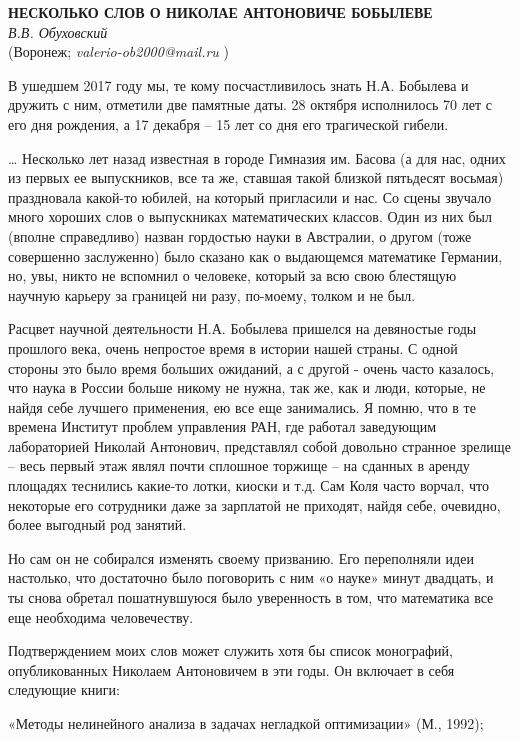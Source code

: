 \begin{center}{ \bf  НЕСКОЛЬКО СЛОВ О НИКОЛАЕ АНТОНОВИЧЕ БОБЫЛЕВЕ}\\
{\it В.В. Обуховский} \\
(Воронеж; {\it valerio-ob2000@mail.ru} )
\end{center}

В ушедшем 2017 году мы, те кому посчастливилось знать Н.А. Бобылева и дружить с ним, отметили две памятные даты. 28 октября исполнилось 70 лет с его дня рождения, а 17 декабря – 15 лет со дня его трагической гибели.

	… Несколько лет назад известная в городе Гимназия им. Басова (а для нас, одних из первых ее выпускников, все та же, ставшая такой близкой пятьдесят восьмая) праздновала какой-то юбилей, на который пригласили и нас. Со сцены звучало много хороших слов о выпускниках математических классов. Один из них был (вполне справедливо) назван гордостью науки в Австралии, о другом (тоже совершенно заслуженно) было сказано как о выдающемся математике Германии, но, увы, никто не вспомнил о человеке, который за всю свою блестящую научную карьеру за границей ни разу, по-моему, толком и не был.

	Расцвет научной деятельности Н.А. Бобылева пришелся на девяностые годы прошлого века, очень непростое время в истории нашей страны. С одной стороны это было время больших ожиданий, а с другой - очень часто казалось, что наука в России больше никому не нужна, так же, как и люди, которые, не найдя себе лучшего применения, ею все еще занимались. Я помню, что в те времена Институт проблем управления РАН, где работал заведующим лабораторией Николай Антонович, представлял собой довольно странное зрелище – весь первый этаж являл почти сплошное торжище – на сданных в аренду площадях теснились какие-то лотки, киоски и т.д. Сам Коля часто ворчал, что некоторые его сотрудники даже за зарплатой не приходят, найдя себе, очевидно, более выгодный род занятий.

	Но сам он не собирался изменять своему призванию.  Его переполняли идеи настолько, что достаточно было поговорить с ним «о науке» минут двадцать, и ты снова обретал пошатнувшуюся было уверенность в том, что математика все еще необходима человечеству.

	Подтверждением моих слов может служить хотя бы список монографий, опубликованных Николаем Антоновичем в эти годы. Он включает в себя следующие книги:

«Методы нелинейного анализа в задачах негладкой оптимизации» (М., 1992);

